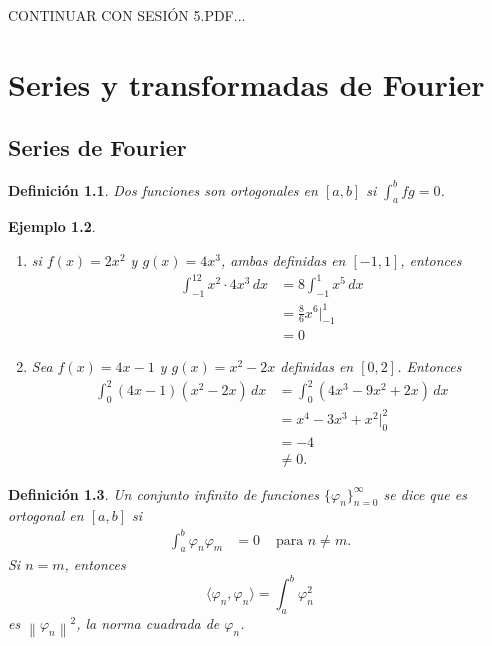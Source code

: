 \documentclass[11pt,letterpaper]{report}
\newtheorem{defn}{Definición}[chapter]
\newtheorem{example}[defn]{Ejemplo}
\newcommand\norm[1]{\left\|#1\right\|}
\newcommand\<{\langle}
\renewcommand\>{\rangle}
\renewcommand\phi\varphi
\begin{document}
CONTINUAR CON SESIÓN 5.PDF...

\chapter{Series y transformadas de Fourier}

\section{Series de Fourier}

\begin{defn}
  Dos funciones son ortogonales en $[a,b]$ si $\int_a^bfg=0$.
\end{defn}
\begin{example}
  \begin{enumerate}
    \item si $f(x)=2x^2$ y $g(x)=4x^3$, ambas definidas en
    $[-1,1]$, entonces
    \begin{align*}
      \int_{-1}^12x^2\cdot 4x^3\,dx
      &= 8\int_{-1}^1x^5\,dx \\
      &= \frac{8}{6}x^6|_{-1}^1 \\
      &= 0
    \end{align*}
    \item Sea $f(x)=4x-1$ y $g(x)=x^2-2x$ definidas en $[0,2]$.
    Entonces
    \begin{align*}
      \int_0^2(4x-1)(x^2-2x)\,dx
      &= \int_0^2(4x^3-9x^2+2x)\,dx \\
      &= x^4-3x^3+x^2 |_0^2 \\
      &= -4 \\
      &\neq 0.
    \end{align*}
  \end{enumerate}
\end{example}

\begin{defn}
  Un conjunto infinito de funciones $\{\phi_n\}_{n=0}^\infty$ se
  dice que es ortogonal en $[a,b]$ si
  \begin{align*}
    \int_a^b\phi_n\phi_m &= 0 & \text{ para } n\neq m.
  \end{align*}
  Si $n=m$, entonces
  \[
    \<\phi_n,\phi_n\> = \int_a^b \phi_n^2
  \]
  es $\norm{\phi_n}^{2}$, la norma cuadrada de $\phi_n$.
\end{defn}
\end{document}
